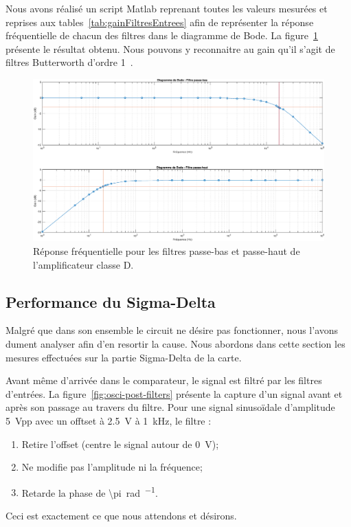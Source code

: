 \documentclass[10pt, oneside, a4paper]{article}
\begin{document}
Nous avons réalisé un script Matlab\textregistered{} reprenant toutes les valeurs mesurées et reprises aux tables~\ref{tab:gainFiltresEntrees} afin de représenter la réponse fréquentielle de chacun des filtres dans le diagramme de Bode.
La figure~\ref{fig:resultatRepFreq} présente le résultat obtenu.
Nous pouvons y reconnaitre au gain qu'il s'agit de filtres Butterworth d'ordre 1~\cite{Horowitz:2015aa}.
\begin{figure}[!ht]
    \centering
    \includegraphics[width=\textwidth]{eps/bode-filtres.eps}
    \caption{Réponse fréquentielle pour les filtres passe-bas
             et passe-haut de l'amplificateur classe D.}
    \label{fig:resultatRepFreq}
\end{figure}

\subsection{Performance du Sigma-Delta}
Malgré que dans son ensemble le circuit ne désire pas fonctionner, nous l'avons dument analyser afin d'en resortir la cause.
Nous abordons dans cette section les mesures effectuées sur la partie Sigma-Delta de la carte.

Avant même d'arrivée dans le comparateur, le signal est filtré par les filtres d'entrées.
La figure~\ref{fig:osci-post-filters} présente la capture d'un signal avant et après son passage au travers du filtre.
Pour une signal sinusoïdale d'amplitude \SI{5}{\volt}pp avec un offtset à \SI{2.5}{\volt} à \SI{1}{\kilo\hertz}, le filtre :
\begin{enumerate}
	\item Retire l'offset (centre le signal autour de \SI{0}{\volt});
	\item Ne modifie pas l'amplitude ni la fréquence;
	\item Retarde la phase de \SI{\pi}{\radian\per\sec}.
\end{enumerate}
Ceci est exactement ce que nous attendons et désirons.
\end{document}
